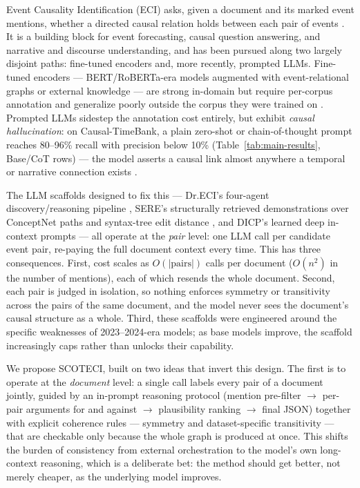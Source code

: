 \documentclass[11pt]{article}
\newcommand{\method}{SCOTECI}
\begin{document}
Event Causality Identification (ECI) asks, given a document and its marked event
mentions, whether a directed causal relation holds between each pair of events
\citep{cheng2025survey}. It is a building block for event forecasting, causal
question answering, and narrative and discourse understanding, and has been pursued
along two largely disjoint paths: fine-tuned encoders and, more recently, prompted
LLMs. Fine-tuned encoders --- BERT/RoBERTa-era models augmented with event-relational
graphs or external knowledge --- are strong in-domain but require per-corpus
annotation and generalize poorly outside the corpus they were trained on
\citep{cai2025dreci, hao2026sere}. Prompted LLMs sidestep the annotation cost
entirely, but exhibit \emph{causal hallucination}: on Causal-TimeBank, a plain
zero-shot or chain-of-thought prompt reaches 80--96\% recall with precision below
10\% (Table~\ref{tab:main-results}, Base/CoT rows) --- the model asserts a causal
link almost anywhere a temporal or narrative connection exists \citep{gao2023chatgpt}.

The LLM scaffolds designed to fix this --- Dr.ECI's four-agent discovery/reasoning
pipeline \citep{cai2025dreci}, SERE's structurally retrieved demonstrations over
ConceptNet paths and syntax-tree edit distance \citep{hao2026sere}, and DICP's
learned deep in-context prompts \citep{mu2025dicp} --- all operate at the
\emph{pair} level: one LLM call per candidate event pair, re-paying the full
document context every time. This has three consequences. First, cost scales as
$O(|\text{pairs}|)$ calls per document ($O(n^2)$ in the number of mentions), each
of which resends the whole document. Second, each pair is judged in isolation, so
nothing enforces symmetry or transitivity across the pairs of the same document, and
the model never sees the document's causal structure as a whole. Third, these
scaffolds were engineered around the specific weaknesses of 2023--2024-era models;
as base models improve, the scaffold increasingly caps rather than unlocks their
capability.

We propose \method{}, built on two ideas that invert this design. The first is to
operate at the \emph{document} level: a single call labels every pair of a document
jointly, guided by an in-prompt reasoning protocol (mention pre-filter $\to$
per-pair arguments for and against $\to$ plausibility ranking $\to$ final JSON)
together with explicit coherence rules --- symmetry and dataset-specific transitivity
--- that are checkable only because the whole graph is produced at once. This shifts
the burden of consistency from external orchestration to the model's own long-context
reasoning, which is a deliberate bet: the method should get better, not merely
cheaper, as the underlying model improves.
\end{document}
